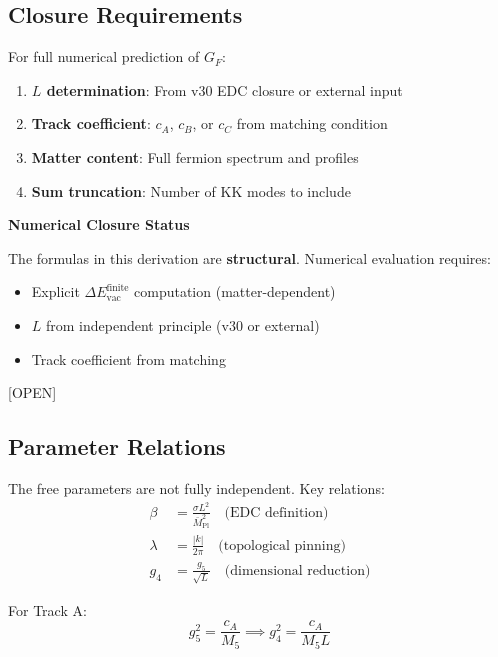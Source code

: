 \documentclass[11pt,a4paper]{article}
\newcommand{\tagOPEN}{\textcolor{red!70!black}{[OPEN]}}
\begin{document}
\subsection{Closure Requirements}

For full numerical prediction of $G_F$:
\begin{enumerate}
    \item \textbf{$L$ determination}: From v30 EDC closure or external input
    \item \textbf{Track coefficient}: $c_A$, $c_B$, or $c_C$ from matching condition
    \item \textbf{Matter content}: Full fermion spectrum and profiles
    \item \textbf{Sum truncation}: Number of KK modes to include
\end{enumerate}

\begin{openbox}
\textbf{Numerical Closure Status}

The formulas in this derivation are \textbf{structural}. Numerical evaluation
requires:
\begin{itemize}
    \item Explicit $\Delta E_{\text{vac}}^{\text{finite}}$ computation (matter-dependent)
    \item $L$ from independent principle (v30 or external)
    \item Track coefficient from matching
\end{itemize}
\tagOPEN
\end{openbox}

\subsection{Parameter Relations}

The free parameters are not fully independent. Key relations:
\begin{align}
\label{eq:param-beta-sigma}
\beta &= \frac{\sigma L^2}{\bar{M}_{\text{Pl}}^2} \quad \text{(EDC definition)} \\
\label{eq:param-lambda-k}
\lambda &= \frac{|k|}{2\pi} \quad \text{(topological pinning)} \\
\label{eq:param-g4-g5}
g_4 &= \frac{g_5}{\sqrt{L}} \quad \text{(dimensional reduction)}
\end{align}

For Track A:
\begin{equation}
\label{eq:track-A-relation}
g_5^2 = \frac{c_A}{M_5} \implies g_4^2 = \frac{c_A}{M_5 L}
\end{equation}
\end{document}
